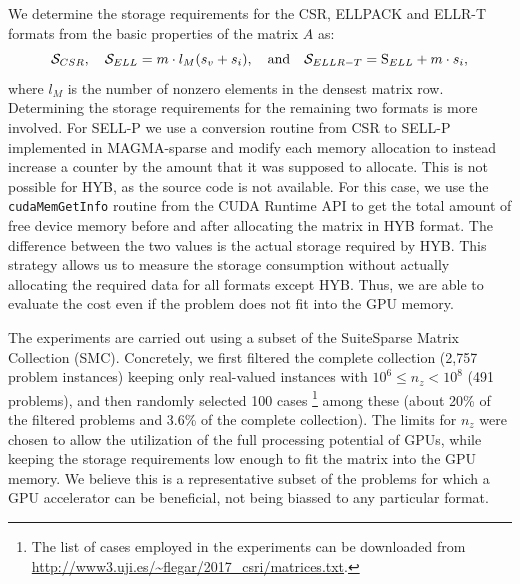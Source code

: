 We determine the storage requirements for the CSR, ELLPACK and ELLR-T formats
from the basic properties of the matrix $A$ as:
\[
    {\cal S}_{CSR}, \quad
    {\cal S}_{ELL}     = m \cdot l_{M}(s_v + s_i), \quad \mbox{\rm and} \quad
    {\cal S}_{ELLR-T}  = \text{S}_{ELL} + m \cdot s_i,
\]
where $l_{M}$ is the number of nonzero elements in the densest matrix row.
Determining the storage requirements for the remaining two formats
is more involved.
For SELL-P we use a conversion routine from CSR to SELL-P implemented in
MAGMA-sparse and modify each memory allocation
to instead increase a counter by the amount that it was supposed to allocate.
This is not possible for HYB, as the source code is not available.
For this case, we use the \texttt{cudaMemGetInfo} routine from the
CUDA Runtime API 
to get the total amount of free device memory
before and after allocating the matrix in HYB format.
The difference between the two values is the actual storage required by HYB.
This strategy allows us to measure the storage consumption
without actually allocating the required data for all formats except HYB.
Thus, we are able to evaluate the cost even if
the problem does not fit into the GPU memory.

The experiments are carried out using a subset
of the SuiteSparse Matrix Collection (SMC).
Concretely, we first filtered the complete collection (2,757 problem instances)
keeping only real-valued instances with $10^6 \leq n_z < 10^8$ (491 problems),
and then randomly selected 100 cases%
\footnote{The list of cases employed in the experiments can be downloaded from
\mbox{\url{http://www3.uji.es/~flegar/2017_csri/matrices.txt}}.}
among these
(about 20\% of the filtered problems and 3.6\% of the complete collection). 
The limits for $n_z$ were chosen to allow the utilization
of the full processing potential of GPUs,
while keeping the storage requirements low enough
to fit the matrix into the GPU memory.
We believe this is a representative subset of the
problems for which a GPU accelerator can be beneficial,
not being biassed to any particular format.

